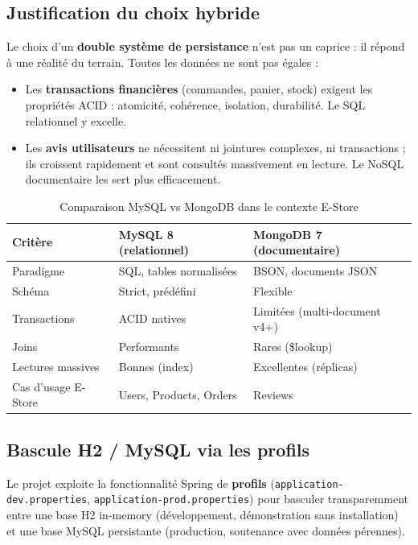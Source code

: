 \documentclass[11pt,a4paper,oneside]{report}
\begin{document}
\subsection{Justification du choix hybride}
Le choix d'un \textbf{double système de persistance} n'est pas un caprice :
il répond à une réalité du terrain. Toutes les données ne sont pas égales :

\begin{itemize}
  \item Les \textbf{transactions financières} (commandes, panier, stock)
    exigent les propriétés ACID : atomicité, cohérence, isolation,
    durabilité. Le SQL relationnel y excelle.
  \item Les \textbf{avis utilisateurs} ne nécessitent ni jointures
    complexes, ni transactions ; ils croissent rapidement et sont
    consultés massivement en lecture. Le NoSQL documentaire les sert plus
    efficacement.
\end{itemize}

\begin{table}[htbp]
\centering
\caption{Comparaison MySQL vs MongoDB dans le contexte E-Store}
\label{tab:dbcompare}
\small
\begin{tabularx}{\textwidth}{lXX}
\toprule
\textbf{Critère} & \textbf{MySQL 8 (relationnel)} & \textbf{MongoDB 7 (documentaire)}\\
\midrule
Paradigme         & SQL, tables normalisées       & BSON, documents JSON\\
Schéma            & Strict, prédéfini             & Flexible\\
Transactions      & ACID natives                  & Limitées (multi-document v4+)\\
Joins             & Performants                   & Rares (\$lookup)\\
Lectures massives & Bonnes (index)                & Excellentes (réplicas)\\
Cas d'usage E-Store & Users, Products, Orders     & Reviews\\
\bottomrule
\end{tabularx}
\end{table}

\subsection{Bascule H2 / MySQL via les profils}
Le projet exploite la fonctionnalité Spring de \textbf{profils}
(\texttt{application-dev.properties}, \texttt{application-prod.properties})
pour basculer transparemment entre une base H2 in-memory (développement,
démonstration sans installation) et une base MySQL persistante
(production, soutenance avec données pérennes).
\end{document}
